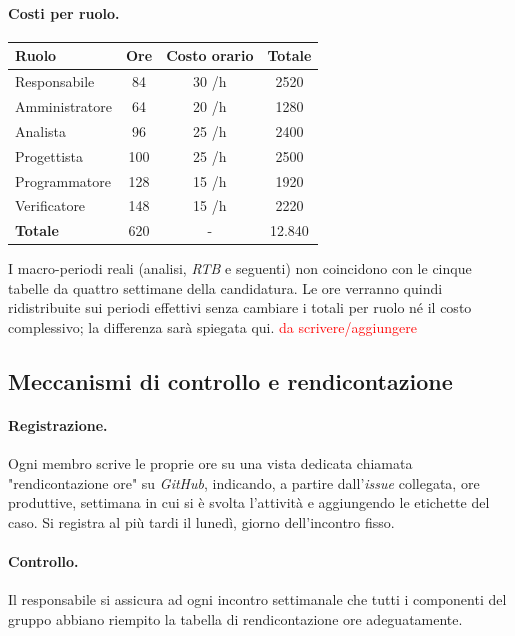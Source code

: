 \documentclass[11pt, a4paper]{article}
\newcommand{\ds}{\textcolor{red}{da scrivere/aggiungere}} %
\begin{document}
	
	\paragraph{Costi per ruolo.}
	\begin{center}
		\renewcommand{\arraystretch}{1.3}
		\begin{tabular}{|l|c|c|c|}
			\hline
			\rowcolor{gray!10} \textbf{Ruolo} & \textbf{Ore} & \textbf{Costo orario} & \textbf{Totale} \\ \hline
			Responsabile   & 84 & 30 \texteuro/h & 2520 \texteuro \\ \hline
			Amministratore & 64 & 20 \texteuro/h & 1280 \texteuro  \\ \hline
			Analista       & 96 & 25 \texteuro/h & 2400 \texteuro  \\ \hline
			Progettista    & 100 & 25 \texteuro/h & 2500 \texteuro  \\ \hline
			Programmatore  & 128 & 15 \texteuro/h & 1920 \texteuro  \\ \hline
			Verificatore   & 148 & 15 \texteuro/h & 2220 \texteuro  \\ \hline
			\rowcolor{gray!10} \textbf{Totale} & 620 & - & 12.840 \texteuro \\ \hline
		\end{tabular}
	\end{center}
	I macro-periodi reali (analisi, \textit{RTB} e seguenti) non coincidono con le cinque tabelle da quattro settimane della candidatura. Le ore verranno quindi ridistribuite sui periodi effettivi senza cambiare i totali per ruolo né il costo complessivo; la differenza sarà spiegata qui. \ds
	
	\subsection{Meccanismi di controllo e rendicontazione}
	\paragraph{Registrazione.} Ogni membro scrive le proprie ore su una vista dedicata chiamata "rendicontazione ore" su \textit{GitHub}, indicando, a partire dall'\textit{issue} collegata, ore produttive, settimana in cui si è svolta l'attività e aggiungendo le etichette del caso. Si registra al più tardi il lunedì, giorno dell'incontro fisso.
	
	\paragraph{Controllo.} Il responsabile si assicura ad ogni incontro settimanale che tutti i componenti del gruppo abbiano riempito la tabella di rendicontazione ore adeguatamente.
	
\end{document}
